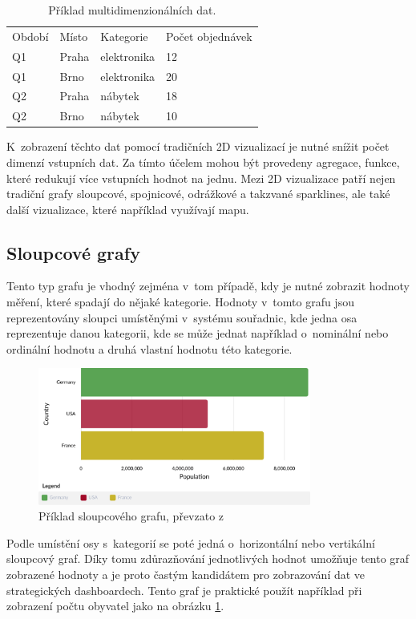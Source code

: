 \begin{table}[H]
\centering
\begin{tabular}{llll}
\rowcolor[HTML]{CCCCCC} 
Období & Místo & Kategorie   & Počet objednávek \\
Q1     & Praha & elektronika & 12               \\
\rowcolor[HTML]{F3F3F3} 
Q1     & Brno  & elektronika & 20               \\
Q2     & Praha & nábytek     & 18               \\
\rowcolor[HTML]{F3F3F3} 
Q2     & Brno  & nábytek     & 10              

\end{tabular}
\caption{Příklad multidimenzionálních dat.}
\end{table}
K~zobrazení těchto dat pomocí tradičních 2D vizualizací je nutné snížit počet dimenzí vstupních dat. Za tímto účelem mohou být provedeny agregace, funkce, které redukují více vstupních hodnot na jednu. Mezi 2D vizualizace patří nejen tradiční grafy sloupcové, spojnicové, odrážkové a takzvané sparklines, ale také další vizualizace, které například využívají mapu.

\subsection*{Sloupcové grafy}
Tento typ grafu je vhodný zejména v~tom případě, kdy je nutné zobrazit hodnoty měření, které spadají do nějaké kategorie. Hodnoty v~tomto grafu jsou reprezentovány sloupci umístěnými v~systému souřadnic, kde jedna osa reprezentuje danou kategorii, kde se může jednat například o~nominální nebo ordinální hodnotu a druhá vlastní hodnotu této kategorie.
\begin{figure}[H]
\label{bar}
\begin{center}
    \includegraphics[width=0.8\textwidth]{obrazky-figures/bar.pdf}
\end{center}
\caption{Příklad sloupcového grafu, převzato z\protect\footnotemark}
\end{figure}
Podle umístění osy s~kategorií se poté jedná o~horizontální nebo vertikální sloupcový graf. Díky tomu zdůrazňování jednotlivých hodnot umožňuje tento graf zobrazené hodnoty a je proto častým kandidátem pro zobrazování dat ve strategických dashboardech. Tento graf je praktické použít například při zobrazení počtu obyvatel jako na obrázku \ref{bar}.

